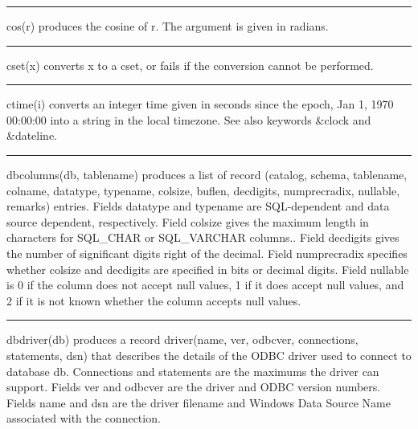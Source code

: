 \bigskip\hrule\vspace{0.1cm}

\noindent
{}cos(r) produces the cosine of r. The argument is given in
radians.

\bigskip\hrule\vspace{0.1cm}

\noindent
{}cset(x) converts x to a cset, or fails if the
conversion cannot be performed.

\bigskip\hrule\vspace{0.1cm}

\noindent
{}ctime(i) converts an integer time
given in seconds since the epoch, Jan 1, 1970 00:00:00 into a string in
the local timezone. See also keywords \&clock and \&dateline.

\bigskip\hrule\vspace{0.1cm}

\noindent
{}dbcolumns(db, tablename) produces a list of record
(catalog, schema, tablename, colname, datatype, typename, colsize,
buflen, decdigits, numprecradix, nullable, remarks) entries. Fields
\textsf{datatype} and \textsf{typename} are SQL-dependent and data
source dependent, respectively. Field \textsf{colsize} gives the
maximum length in characters for SQL\_CHAR or SQL\_VARCHAR columns..
Field \textsf{decdigits} gives the number of significant digits right
of the decimal. Field \textsf{numprecradix} specifies whether
\textsf{colsize} and \textsf{decdigits} are specified in bits or
decimal digits. Field \textsf{nullable} is 0 if the column does not
accept null values, 1 if it does accept null values, and 2 if it is not
known whether the column accepts null values.

\bigskip\hrule\vspace{0.1cm}

\noindent
{}dbdriver(db) produces a record driver(name, ver,
odbcver, connections, statements, dsn) that describes the details of
the ODBC driver used to connect to database db. Connections
and statements are the maximums the driver can support. Fields
\textsf{ver} and \textsf{odbcver} are the driver and ODBC version
numbers. Fields \textsf{name} and \textsf{dsn} are the driver filename
and Windows Data Source Name associated with the connection.


